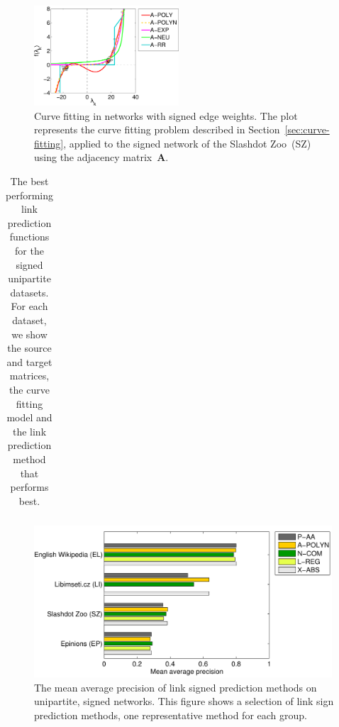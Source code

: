 \documentclass[11pt,a4paper]{book}
\newcommand{\wFull}{0.99}
\newcommand{\wTwo}{0.48}
\begin{document}
\begin{figure}[h!]
  \centering
  \includegraphics[width=\wTwo\textwidth]
                  {img-svg/curve.symf.slashdot-zoo.a.clean}
  \caption{
    Curve fitting in networks with signed edge weights.  The plot
    represents the curve fitting problem described in
    Section~\ref{sec:curve-fitting}, applied to the signed network of the
    Slashdot Zoo~(\textsf{SZ}) using the adjacency matrix~$\mathbf A$.  
  }
  \label{fig:signed-spectral-transformation}
\end{figure}

\begin{table}[h!]
  \centering
  \caption{
    The best performing link prediction functions for the signed
    unipartite datasets.  
    For each dataset, we show the source and target matrices, the curve
    fitting model and the link prediction method that performs best. 
  }
  \begin{tabular}{ lllll }
    \toprule
    
    \midrule
    
    \bottomrule
  \end{tabular}			
  \label{tab:bestcurve-signed}
\end{table}

\begin{figure}[h!]
  \centering
  \includegraphics[width=\wFull\textwidth]{img-eps/resultsbar-sign}
  \caption{
    The mean average precision of link signed prediction methods on
    unipartite, signed networks.  This figure shows a selection of link
    sign prediction methods, one representative method for each group. 
  }
  \label{fig:results-sign}
\end{figure}
\end{document}
